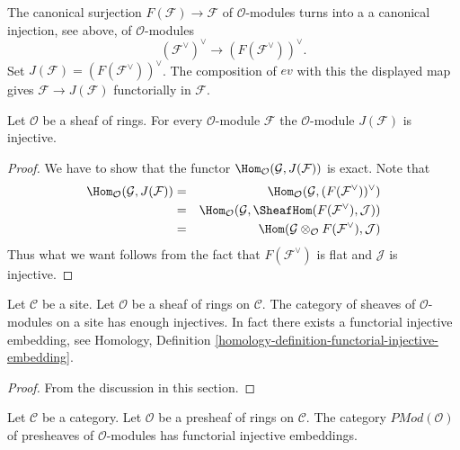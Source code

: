 \noindent
The canonical surjection
$F(\mathcal{F}) \to \mathcal{F}$ of $\mathcal{O}$-modules turns into a
a canonical injection, see above, of $\mathcal{O}$-modules
$$
(\mathcal{F}^\vee)^\vee \longrightarrow (F(\mathcal{F}^\vee))^\vee.
$$
Set $J(\mathcal{F}) = (F(\mathcal{F}^\vee))^\vee$.
The composition of $ev$ with this
the displayed map gives
$\mathcal{F} \to J(\mathcal{F})$ functorially in $\mathcal{F}$.

\begin{lemma}
\label{lemma-JM-injective-sheaves}
Let $\mathcal{O}$ be a sheaf of rings.
For every $\mathcal{O}$-module $\mathcal{F}$ the
$\mathcal{O}$-module $J(\mathcal{F})$ is injective.
\end{lemma}

\begin{proof}
We have to show that the functor
$\Hom_\mathcal{O}(\mathcal{G}, J(\mathcal{F}))$
is exact. Note that
\begin{eqnarray*}
\Hom_\mathcal{O}(\mathcal{G}, J(\mathcal{F}))
& = &
\Hom_\mathcal{O}(\mathcal{G}, (F(\mathcal{F}^\vee))^\vee) \\
& = &
\Hom_\mathcal{O}
(\mathcal{G}, \SheafHom(F(\mathcal{F}^\vee), \mathcal{J})) \\
& = &
\Hom(\mathcal{G} \otimes_\mathcal{O} F(\mathcal{F}^\vee), \mathcal{J})
\end{eqnarray*}
Thus what we want follows from the fact that $F(\mathcal{F}^\vee)$
is flat and $\mathcal{J}$ is injective.
\end{proof}

\begin{theorem}
\label{theorem-sheaves-modules-injectives}
Let $\mathcal{C}$ be a site.
Let $\mathcal{O}$ be a sheaf of rings on $\mathcal{C}$.
The category of sheaves of $\mathcal{O}$-modules on a
site has enough injectives. In fact there exists
a functorial injective embedding, see
Homology, Definition \ref{homology-definition-functorial-injective-embedding}.
\end{theorem}

\begin{proof}
From the discussion in this section.
\end{proof}

\begin{proposition}
\label{proposition-presheaves-modules}
Let $\mathcal{C}$ be a category.
Let $\mathcal{O}$ be a presheaf of rings on $\mathcal{C}$.
The category $\textit{PMod}(\mathcal{O})$ of presheaves of
$\mathcal{O}$-modules has functorial injective embeddings.
\end{proposition}


